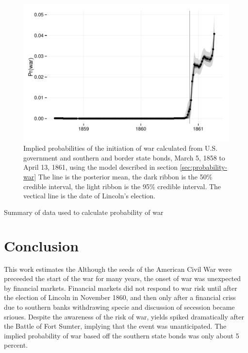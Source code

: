 \documentclass[11pt, oneside, article]{memoir}\usepackage[]{graphicx}\usepackage[]{color}
\begin{document}
\begin{figure}
  \centerfloat
  \includegraphics{figures/fig_prwar2-1}
  \caption{
    Implied probabilities of the initiation of war calculated from U.S. government and southern and border state bonds, March  5, 1858 to April 13, 1861, using the model described in section \ref{sec:probability-war}
    The line is the posterior mean, the dark ribbon is the 50\% credible interval, the light ribbon is the 95\% credible interval.
    The vectical line is the date of Lincoln's election.
  }
  \label{fig:prwar2}
\end{figure}

\begin{table}
  \centerfloat
  
\caption{Summary of data used to calculate probability of war}
\label{tab:prwar1}
\end{table}

\section{Conclusion}
\label{sec:conclusion}

This work estimates the
Although the seeds of the American Civil War were preceeded the start of the war for many years, the onset of war was unexpected by financial markets.
Financial markets did not respond to war risk until after the election of Lincoln in November 1860, and then only after a financial criss due to southern banks withdrawing specie and discussion of secession became srioues.
Despite the awareness of the risk of war, yields spiked dramatically after the Battle of Fort Sumter, implying that the event was unanticipated.
The implied probability of war based off the southern state bonds was only about 5 percent.
\end{document}

